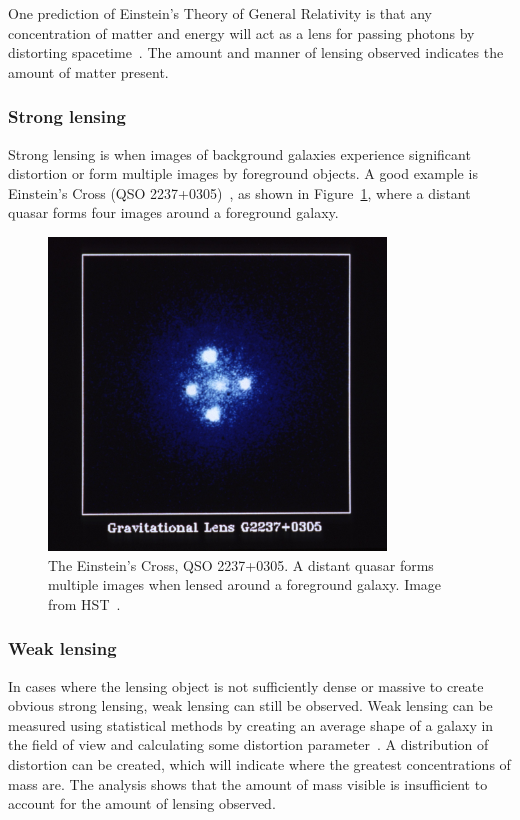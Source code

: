 One prediction of Einstein's Theory of General Relativity is that any concentration of matter and energy will act as a lens for passing photons by distorting spacetime~\cite{Einstein:1936}. The amount and manner of lensing observed indicates the amount of matter present.

\subsubsection{Strong lensing}

Strong lensing is when images of background galaxies experience significant distortion or form multiple images by foreground objects. A good example is Einstein's Cross (QSO 2237+0305)~\cite{einstein_cross}, as shown in Figure~\ref{fig:einstein_cross}, where a distant quasar forms four images around a foreground galaxy.

\begin{figure}[htb]
    \centering
    \includegraphics[width=0.8\textwidth]{figures/dm/einstein_cross}
    \caption{The Einstein's Cross, QSO 2237+0305. A distant quasar forms multiple images when lensed around a foreground galaxy. Image from HST~\cite{einstein_cross}.}\label{fig:einstein_cross}
\end{figure}

\subsubsection{Weak lensing}

In cases where the lensing object is not sufficiently dense or massive to create obvious strong lensing, weak lensing can still be observed. Weak lensing can be measured using statistical methods by creating an average shape of a galaxy in the field of view and calculating some distortion parameter~\cite{Bartelmann:1999yn}. A distribution of distortion can be created, which will indicate where the greatest concentrations of mass are. The analysis shows that the amount of mass visible is insufficient to account for the amount of lensing observed.

